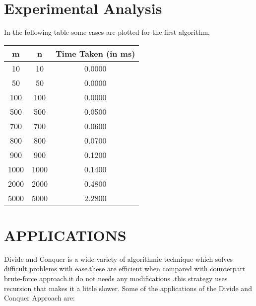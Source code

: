 \documentclass[10pt]{article}
\begin{document}
 \section{Experimental Analysis}
In the following table some cases are plotted for the first algorithm,\newline
\begin{center}
 \begin{tabular}{||c | c | c||}
 \hline
 m & n & Time Taken (in ms) \\ [0.5ex]
 \hline\hline
 10 & 10 & 0.0000 \\
 \hline
 50 & 50 & 0.0000 \\
 \hline
 100 & 100 & 0.0000 \\
 \hline
 500 & 500 & 0.0500 \\
 \hline
 700 & 700 & 0.0600 \\
 \hline
 800 & 800 & 0.0700 \\
 \hline
 900 & 900 & 0.1200 \\
 \hline
 1000 & 1000 & 0.1400 \\
 \hline
 2000 & 2000 & 0.4800 \\
 \hline
 5000 & 5000 & 2.2800 \\ [1ex]
 \hline
\end{tabular}
\end{center}

\newline


\iffalse
\section*{APPLICATIONS}
Divide and Conquer is a wide variety of algorithmic technique which solves difficult problems with ease.these are efficient when compared with counterpart brute-force approach.it do not needs any modifications .this strategy uses recursion that makes it a little slower. Some of the applications of the Divide and Conquer Approach are:
\end{document}
